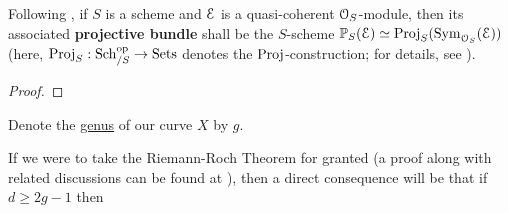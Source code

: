         \begin{convention} \label{conv: fibrations}
            Following \cite[\href{https://stacks.math.columbia.edu/tag/01OA}{Tag 01OA}]{stacks}, if $S$ is a scheme and $\mathcal{E}$ is a quasi-coherent $\mathcal{O}_S$-module, then its associated \textbf{projective bundle} shall be the $S$-scheme $\mathbb{P}_S(\mathcal{E}) \simeq \mathrm{Proj}_S(\mathrm{Sym}_{\mathcal{O}_S}(\mathcal{E}))$ (here, $\mathrm{Proj}_S: \mathrm{Sch}_{/S}^{\mathrm{op}} \to \mathrm{Sets}$ denotes the $\mathrm{Proj}$-construction; for details, see \cite[\href{https://stacks.math.columbia.edu/tag/01NM}{Tag 01NM} and \href{https://stacks.math.columbia.edu/tag/01NS}{Tag 01NS}]{stacks}).
        \end{convention}
        \begin{lemma} \label{lemma: the_abel_jacobi_map_is_a_smooth_fibration}
            
        \end{lemma}
            \begin{proof}
                
            \end{proof}
        \begin{convention}
            Denote the \href{https://stacks.math.columbia.edu/tag/0BY6}{\underline{genus}} of our curve $X$ by $g$.  
        \end{convention}
        \begin{remark}
            If we were to take the Riemann-Roch Theorem for granted (a proof along with related discussions can be found at \cite[\href{https://stacks.math.columbia.edu/tag/0B5B}{Tag 0B5B}]{stacks}), then a direct consequence will be that if $d \geq 2g - 1$ then
        \end{remark}
    

